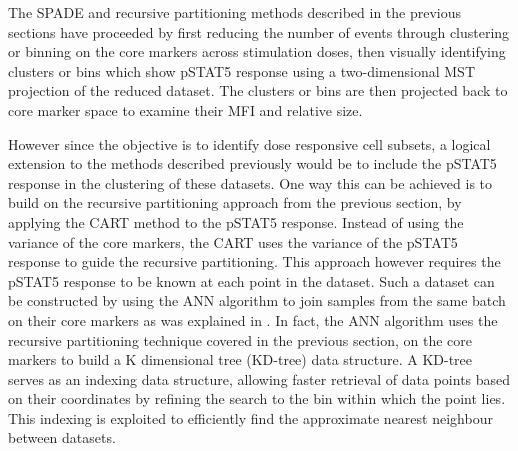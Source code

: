 The \gls{SPADE} and recursive partitioning methods described in the previous sections have proceeded by first reducing the number of events through clustering or binning
on the core markers across stimulation doses, then visually identifying clusters or bins which show pSTAT5 response using a two-dimensional \gls{MST} projection
of the reduced dataset. The clusters or bins are then projected back to core marker space to examine their MFI and relative size.

However since the objective is to identify dose responsive cell subsets,
a logical extension to the methods described previously would be to include the pSTAT5 response
in the clustering of these datasets. 
One way this can be achieved is to build on the recursive partitioning approach from the previous section,
by applying the \acrfull{CART} method to the pSTAT5 response.
Instead of using the variance of the core markers, the \gls{CART} uses the variance of the pSTAT5 response to guide the recursive
partitioning.
This approach however requires the pSTAT5 response to be known at each point in the dataset.
Such a dataset can be constructed by using the \gls{ANN} algorithm to join samples from the same batch on their core markers
as was explained in .
In fact, the \gls{ANN} algorithm uses the recursive partitioning technique covered in the previous section, on the core markers
to build a K dimensional tree (KD-tree) data structure.
A KD-tree
serves as an indexing data structure,
allowing faster retrieval of data points based on their coordinates
by refining the search to the bin within which the point lies.
This indexing is exploited to efficiently find the approximate nearest neighbour between datasets.

